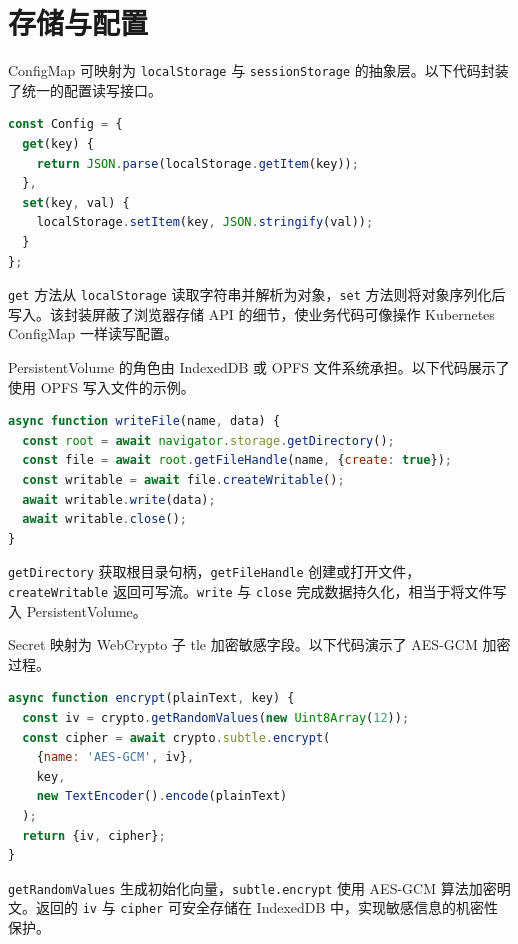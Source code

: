 \chapter{存储与配置}
ConfigMap 可映射为 \texttt{localStorage} 与 \texttt{sessionStorage} 的抽象层。以下代码封装了统一的配置读写接口。\par
\begin{lstlisting}[language=js]
const Config = {
  get(key) {
    return JSON.parse(localStorage.getItem(key));
  },
  set(key, val) {
    localStorage.setItem(key, JSON.stringify(val));
  }
};
\end{lstlisting}
\texttt{get} 方法从 \texttt{localStorage} 读取字符串并解析为对象，\texttt{set} 方法则将对象序列化后写入。该封装屏蔽了浏览器存储 API 的细节，使业务代码可像操作 Kubernetes ConfigMap 一样读写配置。\par
PersistentVolume 的角色由 IndexedDB 或 OPFS 文件系统承担。以下代码展示了使用 OPFS 写入文件的示例。\par
\begin{lstlisting}[language=js]
async function writeFile(name, data) {
  const root = await navigator.storage.getDirectory();
  const file = await root.getFileHandle(name, {create: true});
  const writable = await file.createWritable();
  await writable.write(data);
  await writable.close();
}
\end{lstlisting}
\texttt{getDirectory} 获取根目录句柄，\texttt{getFileHandle} 创建或打开文件，\texttt{createWritable} 返回可写流。\texttt{write} 与 \texttt{close} 完成数据持久化，相当于将文件写入 PersistentVolume。\par
Secret 映射为 WebCrypto 子 tle 加密敏感字段。以下代码演示了 AES-GCM 加密过程。\par
\begin{lstlisting}[language=js]
async function encrypt(plainText, key) {
  const iv = crypto.getRandomValues(new Uint8Array(12));
  const cipher = await crypto.subtle.encrypt(
    {name: 'AES-GCM', iv},
    key,
    new TextEncoder().encode(plainText)
  );
  return {iv, cipher};
}
\end{lstlisting}
\texttt{getRandomValues} 生成初始化向量，\texttt{subtle.encrypt} 使用 AES-GCM 算法加密明文。返回的 \texttt{iv} 与 \texttt{cipher} 可安全存储在 IndexedDB 中，实现敏感信息的机密性保护。\par
